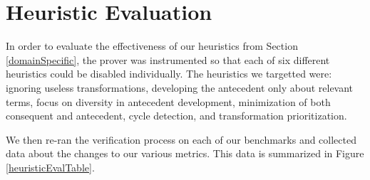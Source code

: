 \FloatBarrier
\section{Heuristic Evaluation\label{heuristicsEval}}
In order to evaluate the effectiveness of our heuristics from Section \ref{domainSpecific}, the prover was instrumented so that each of six different heuristics could be disabled individually.  The heuristics we targetted were: ignoring useless transformations, developing the antecedent only about relevant terms, focus on diversity in antecedent development, minimization of both consequent and antecedent, cycle detection, and transformation prioritization.

We then re-ran the verification process on each of our benchmarks and collected data about the changes to our various metrics.  This data is summarized in Figure \ref{heuristicEvalTable}.

